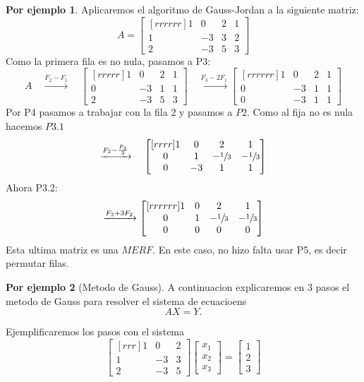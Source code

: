 \documentclass{article}
\theoremstyle{definition}
\theoremstyle{definition}
\newtheorem*{ej}{Por ejemplo}
\theoremstyle{remark}
\begin{document}
\begin{ej}
  Aplicaremos el algoritmo de Gauss-Jordan a la siguiente matriz: \[
    A=\begin{bmatrix}[rrrrrr] 
      1 & 0 & 2 & 1 \\
      1 & -3 & 3 & 2 \\
      2 & -3 & 5 & 3
    \end{bmatrix}
  \]
  Como la primera fila es no nula, pasamos a P3:
  \[
    A \quad \xrightarrow{F_2-F_1} \quad
    \begin{bmatrix}[rrrrr]
      1 & 0 & 2 & 1 \\
      0 & -3 & 1 & 1 \\
      2 & -3 & 5 & 3
      \end{bmatrix} \quad \xrightarrow{F_3-2F_1} \begin{bmatrix}[rrrrrr]
      1 & 0 & 2 & 1 \\
      0 & -3 & 1 & 1 \\
      0 & -3 & 1 & 1 
    \end{bmatrix}
\]
Por P4 pasamos a trabajar con la fila $2$ y pasamos a $P2$. Como al fija no es nula hacemos $P3.1$ \[
  \xrightarrow{F_2-\frac{F_3}{3}} \quad \begin{bmatrix}[rrrr]1 & 0 & 2 & 1 \\ 0 & 1 & -\sfrac{1}{3} & -\sfrac{1}{3} \\ 0 & -3 & 1 & 1 \end{bmatrix}
\]
Ahora P3.2: \[
  \xrightarrow{F_3+3F_2} \begin{bmatrix}[rrrrrr] 1 & 0 & 2 & 1 \\ 0 & 1 & -\sfrac{1}{3} & -\sfrac{1}{3} \\ 0 & 0 & 0 & 0 \end{bmatrix}
\]
Esta ultima matriz es una $MERF$. En este caso, no hizo falta usar P5, es decir permutar filas.
\end{ej} 
\begin{ej}[Metodo de Gauss]
  A continuacion explicaremos en $3$ pasos el metodo de Gauss para resolver el sistema de ecuacioens \[
AX=Y.
  \]
\end{ej}
Ejemplificaremos los pasos con el sistema \begin{equation}\tag{E}
  \begin{bmatrix}[rrr]1 & 0 & 2 \\ 1 & -3 & 3 \\ 2 & -3 & 5 \end{bmatrix} \begin{bmatrix} x_1 \\ x_2 \\ x_3 \end{bmatrix} = \begin{bmatrix} 1 \\ 2 \\ 3 \end{bmatrix}
\end{equation}
\end{document}

